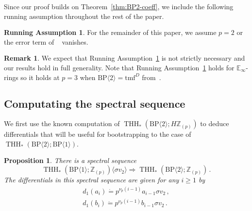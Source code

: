 \documentclass[11pt]{amsart}
\newcommand{\mr}[1]{\mathrm{#1}}
\newcommand{\Z}{\mathbb{Z}}
\newcommand{\tmf}{\mathrm{tmf}}
\newcommand{\BP}{\mr{BP}}
\DeclareMathOperator{\THH}{THH}
\newtheorem{proposition}[equation]{Proposition}
\theoremstyle{definition}
\newtheorem{remark}[equation]{Remark}
\newtheorem{runningassumption}[equation]{Running Assumption}
\numberwithin{equation}{section}
\numberwithin{figure}{section}
\begin{document}
Since our proof builds on Theorem~\ref{thm:BP2-coeff}, we include the following running assumption throughout the rest of the paper. 
\begin{runningassumption}\label{runningassumption}
For the remainder of this paper, we assume $p=2$ or the error term of ~\cite[Equation (3-7)]{ACH24} vanishes.
\end{runningassumption}
\begin{remark}
We expect that Running Assumption~\ref{runningassumption} is not strictly necessary and our results hold in full generality. Note that  Running Assumption~\ref{runningassumption} holds for $\mathbb{E}_\infty$-rings so it holds at $p=3$ when $\BP\langle 2\rangle=\tmf^{D}$ from~\cite{HL10}. 
\end{remark}

\subsection{Computating the spectral sequence}\label{sec:SS}

We first use the known computation of $\THH_*(\BP\langle 2\rangle;H\mathbb{Z}_{(p)})$ to deduce differentials that will be useful for bootstrapping to the case of $\THH_*(\BP\langle 2\rangle;\BP\langle 1\rangle)$. 

\begin{proposition}
  There is a spectral sequence
  \[
    \THH_*(\BP\langle 1\rangle; \Z_{(p)}) \langle \sigma v_2 \rangle \Rightarrow \THH_*(\BP \langle 2 \rangle;\Z_{(p)}) \,.
  \]
The differentials in this spectral sequence are given for any $i \geq 1$ by
  \[
    \begin{gathered}
      d_1(a_i) \dot{=} p^{\nu_p(i-1)} a_{i-1} \sigma v_2 \,, \\
      d_1(b_i) \dot{=} p^{\nu_p(i-1)} b_{i-1} \sigma v_2 \,.
    \end{gathered}
  \]
\end{proposition}
\end{document}
